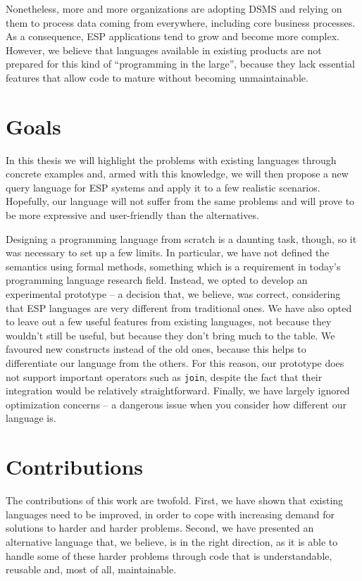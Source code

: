 Nonetheless, more and more organizations are adopting DSMS and relying
on them to process data coming from everywhere, including core
business processes. As a consequence, ESP applications tend to grow
and become more complex. However, we believe that languages available
in existing products are not prepared for this kind of ``programming
in the large'', because they lack essential features that allow code
to mature without becoming unmaintainable.

\section{Goals}

In this thesis we will highlight the problems with existing languages
through concrete examples and, armed with this knowledge, we will then
propose a new query language for ESP systems and apply it to a few
realistic scenarios. Hopefully, our language will not suffer from the
same problems and will prove to be more expressive and user-friendly
than the alternatives.

Designing a programming language from scratch is a daunting task,
though, so it was necessary to set up a few limits. In particular, we
have not defined the semantics using formal methods, something which
is a requirement in today's programming language research
field. Instead, we opted to develop an experimental prototype -- a
decision that, we believe, was correct, considering that ESP languages
are very different from traditional ones. We have also opted to leave
out a few useful features from existing languages, not because they
wouldn't still be useful, but because they don't bring much to the
table. We favoured new constructs instead of the old ones, because
this helps to differentiate our language from the others. For this
reason, our prototype does not support important operators such as
\verb=join=, despite the fact that their integration would be
relatively straightforward. Finally, we have largely ignored
optimization concerns -- a dangerous issue when you consider how
different our language is.

\section{Contributions}

The contributions of this work are twofold. First, we have shown that
existing languages need to be improved, in order to cope with
increasing demand for solutions to harder and harder problems. Second,
we have presented an alternative language that, we believe, is in the
right direction, as it is able to handle some of these harder problems
through code that is understandable, reusable and, most of all,
maintainable.

